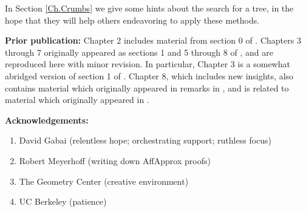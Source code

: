 In Section \ref{Ch.Crumbs} we give some hints about the search for a tree,
in the hope that they will help others endeavoring to apply these methods.
\vskip 8pt

\noindent\textbf {Prior publication:} Chapter 2 includes material from section 0 of \cite{GMT}.
Chapters 3 through 7 originally appeared as sections 1 and 5 through 8 of \cite{GMT},
and are reproduced here with minor revision.  In particular, Chapter 3 is a somewhat abridged version of section 1 of \cite{GMT}.
Chapter 8, which includes new insights, also contains material which originally appeared in remarks in \cite{GMT}, and is related to material which originally appeared in \cite{GMTY}.

\vskip 8pt

\noindent\textbf {Acknowledgements:}
\begin{enumerate}
	\item David Gabai (relentless hope; orchestrating support; ruthless focus)
	\item Robert Meyerhoff (writing down AffApprox proofs)
	\item The Geometry Center (creative environment)
	\item UC Berkeley (patience)
\end{enumerate}
